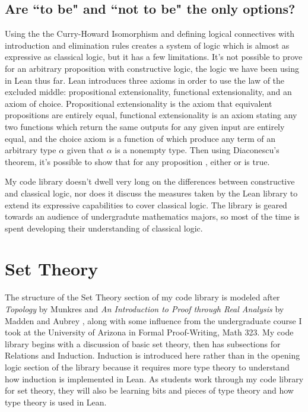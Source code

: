 \subsection{Are ``to be" and ``not to be" the only options?}

Using the the Curry-Howard Isomorphism and defining logical connectives
with introduction and elimination rules creates a system of logic which
is almost as expressive as classical logic, but it has a few limitations.
It's not possible to prove  for an arbitrary proposition 
with constructive logic, the logic we have been using in Lean thus far.
Lean introduces three axioms in order to use the law of the
excluded middle: propositional extensionality, functional
extensionality, and an axiom of choice. Propositional extensionality is the
axiom that equivalent propositions are entirely equal, functional extensionality
is an axiom stating any two functions which return the same outputs for any
given input are entirely equal, and the choice axiom is a function of which produce
any term of an arbitrary type $\alpha$ given that $\alpha$ is a nonempty
type. Then using Diaconescu's theorem, it's possible to show that for any
proposition , either  or  is true. 

My code library doesn't dwell very long on the differences between 
constructive and classical logic, nor does it discuss the measures
taken by the Lean library to extend its expressive capabilities to 
cover classical logic. The library is geared towards an audience of 
undergradute mathematics majors, so most of the time is spent developing
their understanding of classical logic.

\section{Set Theory}

The structure of the Set Theory section of my code library is modeled after 
\textit{Topology} by Munkres \cite{Munkres} and 
\textit{An Introduction to Proof through Real Analysis} 
by Madden and Aubrey \cite{RealAnalysis}, along with
some influence from the undergraduate course I took at the University of Arizona
in Formal Proof-Writing, Math 323. My code library begins with a discussion of basic
set theory, then has subsections for Relations and Induction. 
Induction is introduced here rather than in the opening logic section of the 
library because it requires more type theory to understand how induction is
implemented in Lean. As students work through my code library for set theory,
they will also be learning bits and pieces of type theory and how type theory
is used in Lean. 

